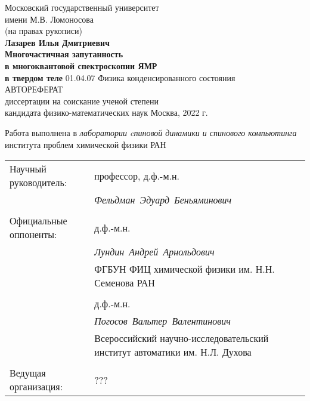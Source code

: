 \begin{titlepage}
\vfill
\begin{center}
  {\large
    Московский государственный университет \\
    имени М.В. Ломоносова
  } \\
  \vfill
  (на правах рукописи) \\
  \vfill
  {\Large \bf Лазарев Илья Дмитриевич} \\
  \vspace{1cm}
  {\Large \bf
      Многочастичная запутанность \\
      в многоквантовой спектроскопии ЯМР \\
      \vspace{2mm}
      в твердом теле
  }
 \vfill
 01.04.07 Физика конденсированного состояния \\
 \vspace{1cm}
 АВТОРЕФЕРАТ \\
 диссертации на соискание ученой степени \\
 кандидата физико-математических наук
 \vfill
 Москва, 2022 г.
\end{center}
\end{titlepage}

Работа выполнена в \textit{лаборатории cпиновой динамики и спинового компьютинга} института проблем химической физики РАН

\vfill

\begin{tabularx}{\textwidth}{
  >{\raggedright\arraybackslash}X 
  >{\raggedright\arraybackslash}X
}%
Научный руководитель: & профессор, д.ф.-м.н. \\
 & \mbox{\textit{Фельдман Эдуард Беньяминович}} \\
 & \\
Официальные оппоненты: &  д.ф.-м.н.\\
 & \mbox{\textit{Лундин Андрей Арнольдович}} \\
 & ФГБУН ФИЦ химической физики им. Н.Н. Семенова РАН \\
 & \\
 & д.ф.-м.н. \\
 & \mbox{\textit{Погосов Вальтер Валентинович}} \\ 
 & Всероссийский научно-исследовательский институт автоматики им. Н.Л. Духова \\
 & \\
 Ведущая организация: & ??? 
\end{tabularx}

